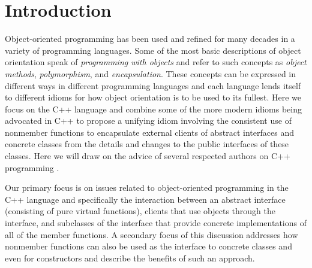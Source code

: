 \documentclass[pdf,ps2pdf,11pt]{SANDreport}
\begin{document}

%
\SANDmain %

%
\section{Introduction}
%

Object-oriented programming has been used and refined for many decades in a
variety of programming languages.  Some of the most basic descriptions of
object orientation speak of {}\textit{programming with objects} and refer to
such concepts as {}\textit{object methods}, {}\textit{polymorphism}, and
{}\textit{encapsulation}.  These concepts can be expressed in different ways
in different programming languages and each language lends itself to different
idioms for how object orientation is to be used to its fullest.  Here we focus
on the C++ language and combine some of the more modern idioms being advocated
in C++ to propose a unifying idiom involving the consistent use of nonmember
functions to encapsulate external clients of abstract interfaces and concrete
classes from the details and changes to the public interfaces of these
classes.  Here we will draw on the advice of several respected authors on C++
programming {}\cite{C++CodingStandards05,EffectiveC++3rd}.

Our primary focus is on issues related to object-oriented programming in the
C++ language and specifically the interaction between an abstract interface
(consisting of pure virtual functions), clients that use objects through the
interface, and subclasses of the interface that provide concrete
implementations of all of the member functions.  A secondary focus of this
discussion addresses how nonmember functions can also be used as the interface
to concrete classes and even for constructors and describe the benefits of
such an approach.
\end{document}
